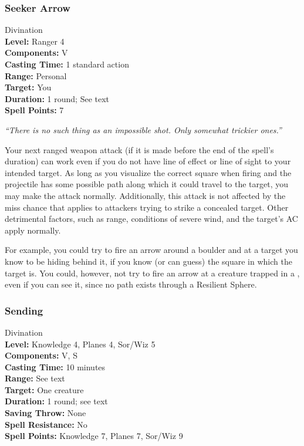 \subsubsection{Seeker Arrow}
\label{Spell:SeekerArrow}
Divination
\\ \textbf{Level:} Ranger 4
\\ \textbf{Components:} V
\\ \textbf{Casting Time:} 1 standard action
\\ \textbf{Range:} Personal
\\ \textbf{Target:} You
\\ \textbf{Duration:} 1 round; See text
\\ \textbf{Spell Points:} 7

\emph{``There is no such thing as an impossible shot. Only somewhat trickier ones.''}

Your next ranged weapon attack (if it is made before the end of the spell's duration) can work even if you do not have line of effect or line of sight to your intended target.
As long as you visualize the correct square when firing and the projectile has some possible path along which it could travel to the target, you may make the attack normally.
Additionally, this attack is not affected by the miss chance that applies to attackers trying to strike a concealed target.
Other detrimental factors, such as range, conditions of severe wind, and the target's AC apply normally.

For example, you could try to fire an arrow around a boulder and at a target you know to be hiding behind it, if you know (or can guess) the square in which the target is.
You could, however, not try to fire an arrow at a creature trapped in a , even if you can see it, since no path exists through a Resilient Sphere.
\subsubsection{Sending}
\label{Spell:Sending}
Divination
\\ \textbf{Level:} Knowledge 4, Planes 4, Sor/Wiz 5
\\ \textbf{Components:} V, S
\\ \textbf{Casting Time:} 10 minutes
\\ \textbf{Range:} See text
\\ \textbf{Target:} One creature
\\ \textbf{Duration:} 1 round; see text
\\ \textbf{Saving Throw:} None
\\ \textbf{Spell Resistance:} No
\\ \textbf{Spell Points:} Knowledge 7, Planes 7, Sor/Wiz 9

